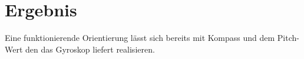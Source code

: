 
\chapter{Ergebnis}
  \label{Ergebnis}


Eine funktionierende Orientierung lässt sich bereits mit Kompass und dem Pitch-Wert den das Gyroskop liefert realisieren.
